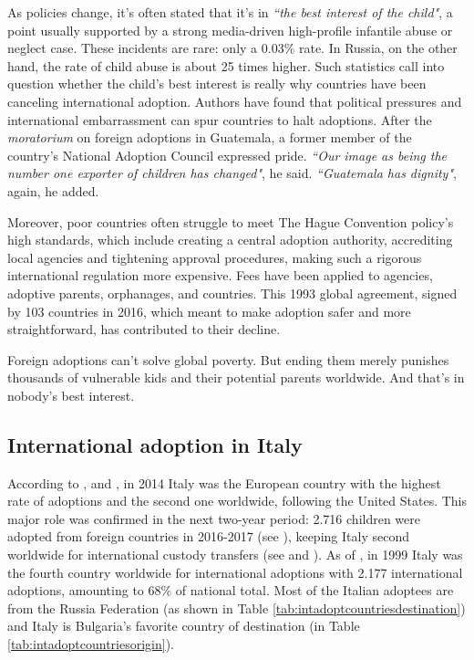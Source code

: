 As policies change, it's often stated that it's in \textit{``the best interest of the child"}, a point usually supported by a strong media-driven high-profile infantile abuse or neglect case. These incidents are rare: only a 0.03\% rate. In Russia, on the other hand, the rate of child abuse is about 25 times higher. Such statistics call into question whether the child's best interest is really why countries have been canceling international adoption. Authors have found that political pressures and international embarrassment can spur countries to halt adoptions. After the \textit{moratorium} on foreign adoptions in Guatemala, a former member of the country's National Adoption Council expressed pride. \textit{``Our image as being the number one exporter of children has changed"}, he said. \textit{``Guatemala has dignity"}, again, he added.

Moreover, poor countries often struggle to meet The Hague Convention policy's high standards, which include creating a central adoption authority, accrediting local agencies and tightening approval procedures, making such a rigorous international regulation more expensive. Fees have been applied to agencies, adoptive parents, orphanages, and countries. This 1993 global agreement, signed by 103 countries in 2016, which meant to make adoption safer and more straightforward, has contributed to their decline.

Foreign adoptions can't solve global poverty. But ending them merely punishes thousands of vulnerable kids and their potential parents worldwide. And that's in nobody's best interest.

\subsection{International adoption in Italy}\label{sub:intadoptioninitaly}
According to \cite{notonlyinfectious}, \cite{nonsoloinfezioni} and \cite{cai2014}, in 2014 Italy was the European country with the highest rate of adoptions and the second one worldwide, following the United States. This major role was confirmed in the next two-year period: 2.716 children were adopted from foreign countries in 2016-2017 (see \cite{cai2016}), keeping Italy second worldwide for international custody transfers (see \cite{adoptdropping_article} and \cite{adoptdropping_book}).
As of \cite{unreport}, in 1999 Italy was the fourth country worldwide for international adoptions with 2.177 international adoptions, amounting to 68\% of national total. Most of the Italian adoptees are from the Russia Federation (as shown in Table \ref{tab:intadoptcountriesdestination}) and Italy is Bulgaria's favorite country of destination (in Table \ref{tab:intadoptcountriesorigin}).

